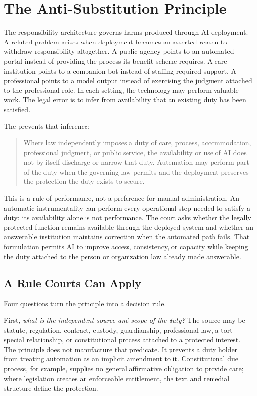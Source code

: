 \section{The Anti-Substitution Principle}
\label{sec:anti-substitution}

The responsibility architecture governs harms produced through AI deployment. A related problem arises when deployment becomes an asserted reason to withdraw responsibility altogether. A public agency points to an automated portal instead of providing the process its benefit scheme requires. A care institution points to a companion bot instead of staffing required support. A professional points to a model output instead of exercising the judgment attached to the professional role. In each setting, the technology may perform valuable work. The legal error is to infer from availability that an existing duty has been satisfied.

The  prevents that inference:

\begin{quote}
Where law independently imposes a duty of care, process, accommodation, professional judgment, or public service, the availability or use of AI does not by itself discharge or narrow that duty. Automation may perform part of the duty when the governing law permits and the deployment preserves the protection the duty exists to secure.
\end{quote}

This is a rule of performance, not a preference for manual administration. An automatic instrumentality can perform every operational step needed to satisfy a duty; its availability alone is not performance. The court asks whether the legally protected function remains available through the deployed system and whether an answerable institution maintains correction when the automated path fails. That formulation permits AI to improve access, consistency, or capacity while keeping the duty attached to the person or organization law already made answerable.

\subsection{A Rule Courts Can Apply}

Four questions turn the principle into a decision rule.

First, \emph{what is the independent source and scope of the duty?} The source may be statute, regulation, contract, custody, guardianship, professional law, a tort special relationship, or constitutional process attached to a protected interest. The principle does not manufacture that predicate. It prevents a duty holder from treating automation as an implicit amendment to it. Constitutional due process, for example, supplies no general affirmative obligation to provide care; where legislation creates an enforceable entitlement, the text and remedial structure define the protection.

